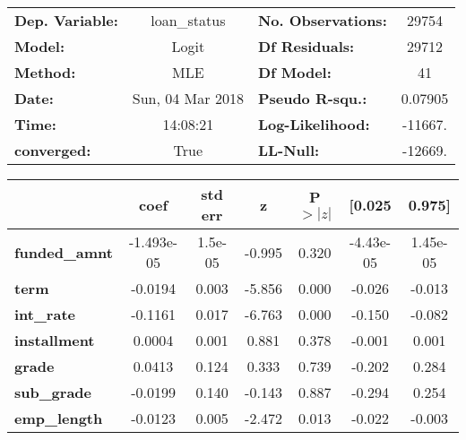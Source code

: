 \begin{center}
\begin{tabular}{lclc}
\toprule
\textbf{Dep. Variable:}                        &   loan\_status    & \textbf{  No. Observations:  } &    29754    \\
\textbf{Model:}                                &      Logit       & \textbf{  Df Residuals:      } &    29712    \\
\textbf{Method:}                               &       MLE        & \textbf{  Df Model:          } &       41    \\
\textbf{Date:}                                 & Sun, 04 Mar 2018 & \textbf{  Pseudo R-squ.:     } &  0.07905    \\
\textbf{Time:}                                 &     14:08:21     & \textbf{  Log-Likelihood:    } &   -11667.   \\
\textbf{converged:}                            &       True       & \textbf{  LL-Null:           } &   -12669.   \\
\bottomrule
\end{tabular}
\begin{tabular}{lcccccc}
                                               & \textbf{coef} & \textbf{std err} & \textbf{z} & \textbf{P$>|z|$} & \textbf{[0.025} & \textbf{0.975]}  \\
\midrule
\textbf{funded\_amnt}                          &   -1.493e-05  &      1.5e-05     &    -0.995  &         0.320        &    -4.43e-05    &     1.45e-05     \\
\textbf{term}                                  &      -0.0194  &        0.003     &    -5.856  &         0.000        &       -0.026    &       -0.013     \\
\textbf{int\_rate}                             &      -0.1161  &        0.017     &    -6.763  &         0.000        &       -0.150    &       -0.082     \\
\textbf{installment}                           &       0.0004  &        0.001     &     0.881  &         0.378        &       -0.001    &        0.001     \\
\textbf{grade}                                 &       0.0413  &        0.124     &     0.333  &         0.739        &       -0.202    &        0.284     \\
\textbf{sub\_grade}                            &      -0.0199  &        0.140     &    -0.143  &         0.887        &       -0.294    &        0.254     \\
\textbf{emp\_length}                           &      -0.0123  &        0.005     &    -2.472  &         0.013        &       -0.022    &       -0.003     \\

\end{tabular}
\end{center}
